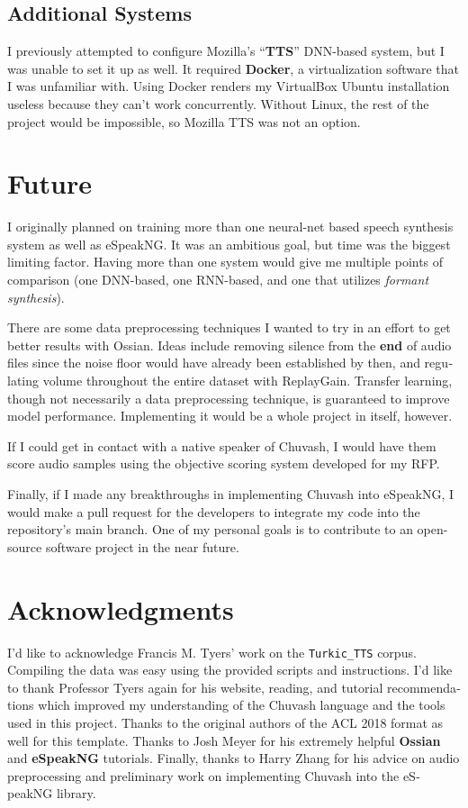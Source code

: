 \documentclass[11pt,a4paper]{article}
\begin{document}
\begin{otherlanguage}{english}
\subsection{Additional Systems}
I previously attempted to configure Mozilla's ``\textbf{TTS}'' DNN-based system, but I was unable to set it up as well. It required \textbf{Docker}, a virtualization software that I was unfamiliar with. Using Docker renders my VirtualBox Ubuntu installation useless because they can't work concurrently. Without Linux, the rest of the project would be impossible, so Mozilla TTS was not an option.

\section{Future}\label{sec:future}
I originally planned on training more than one neural-net based speech synthesis system as well as eSpeakNG. It was an ambitious goal, but time was the biggest limiting factor. Having more than one system would give me multiple points of comparison (one DNN-based, one RNN-based, and one that utilizes \textit{formant synthesis}).

There are some data preprocessing techniques I wanted to try in an effort to get better results with Ossian. Ideas include removing silence from the \textbf{end} of audio files since the noise floor would have already been established by then, and regulating volume throughout the entire dataset with ReplayGain. Transfer learning, though not necessarily a data preprocessing technique, is guaranteed to improve model performance. Implementing it would be a whole project in itself, however.

If I could get in contact with a native speaker of Chuvash, I would have them score audio samples using the objective scoring system developed for my RFP.

Finally, if I made any breakthroughs in implementing Chuvash into eSpeakNG, I would make a pull request for the developers to integrate my code into the repository's main branch. One of my personal goals is to contribute to an open-source software project in the near future.

\section*{Acknowledgments}
I'd like to acknowledge Francis M. Tyers' work on the \texttt{Turkic\_TTS} corpus. Compiling the data was easy using the provided scripts and instructions. I'd like to thank Professor Tyers again for his website, reading, and tutorial recommendations which improved my understanding of the Chuvash language and the tools used in this project. Thanks to the original authors of the ACL 2018 format as well for this template. Thanks to Josh Meyer for his extremely helpful \textbf{Ossian} and \textbf{eSpeakNG} tutorials. Finally, thanks to Harry Zhang for his advice on audio preprocessing and preliminary work on implementing Chuvash into the eSpeakNG library.


\end{otherlanguage}
\end{document}
